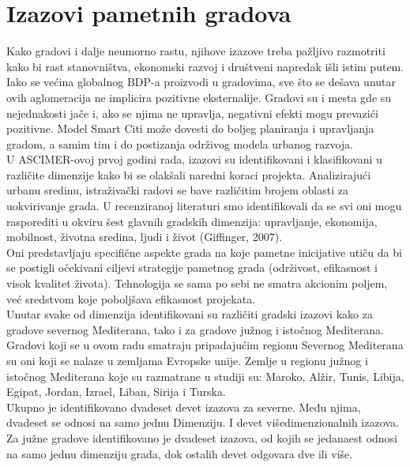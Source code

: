 \documentclass[a4paper,12pt]{article}
\begin{document}
{\section{Izazovi pametnih gradova}	
\label{sec:termini_i_citiranje}

 Kako gradovi i dalje neumorno rastu, njihove izazove treba pažljivo razmotriti kako bi rast stanovništva, ekonomski razvoj i društveni napredak išli istim putem. Iako se većina globalnog BDP-a proizvodi u gradovima, sve što se dešava unutar ovih aglomeracija ne implicira pozitivne eksternalije. Gradovi su i mesta gde su nejednakosti jače i, ako se njima ne upravlja, negativni efekti mogu prevazići pozitivne. Model Smart Citi može dovesti do boljeg planiranja i upravljanja gradom, a samim tim i do postizanja održivog modela urbanog razvoja. \\

U ASCIMER-ovoj prvoj godini rada, izazovi su identifikovani i klasifikovani u različite dimenzije kako bi se olakšali naredni koraci projekta. Analizirajući urbanu sredinu, istraživački radovi se bave različitim brojem oblasti za uokvirivanje grada. U recenziranoj literaturi smo identifikovali da se svi oni mogu rasporediti u okviru šest glavnih gradskih dimenzija: upravljanje, ekonomija, mobilnost, životna sredina, ljudi i život (Giffinger, 2007). \\

Oni predstavljaju specifične aspekte grada na koje pametne inicijative utiču da bi se postigli očekivani ciljevi strategije pametnog grada (održivost, efikasnost i visok kvalitet života). Tehnologija se sama po sebi ne smatra akcionim poljem, već sredstvom koje poboljšava efikasnost projekata. \\

Unutar svake od dimenzija identifikovani su različiti gradski izazovi kako za gradove severnog Mediterana, tako i za gradove južnog i istočnog Mediterana. Gradovi koji se u ovom radu smatraju pripadajućim regionu Severnog Mediterana su oni koji se nalaze u zemljama Evropske unije. Zemlje u regionu južnog i istočnog Mediterana koje su razmatrane u studiji su: Maroko, Alžir, Tunis, Libija, Egipat, Jordan, Izrael, Liban, Sirija i Turska. \\

Ukupno je identifikovano dvadeset devet izazova za severne. Među njima, dvadeset se odnosi na samo jednu Dimenziju. I devet višedimenzionalnih izazova. Za južne gradove identifikovano je dvadeset izazova, od kojih se jedanaest odnosi na samo jednu dimenziju grada, dok ostalih devet odgovara dve ili više.\\


}
\end{document}
